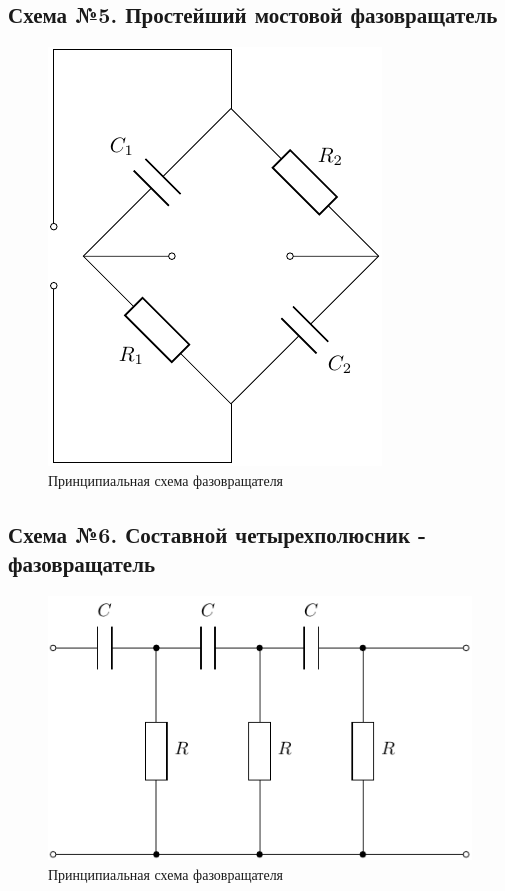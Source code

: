 \subsection{Схема №5. Простейший мостовой фазовращатель}

\begin{figure}[H]
	\centering
	\includegraphics[]{chems/chem5}
	\caption{Принципиальная схема фазовращателя}
	\label{fig:ph_rot}
\end{figure}

\subsection{Схема №6. Составной четырехполюсник - фазовращатель}

\begin{figure}[H]
	\centering
	\includegraphics[]{chems/chem6}
	\caption{Принципиальная схема фазовращателя}
	\label{fig:ph_rot2}
\end{figure}



